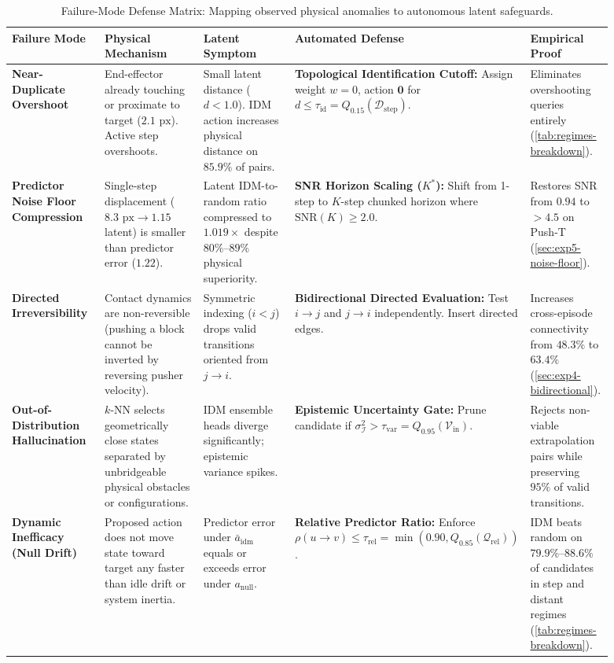 \documentclass[11pt]{article}
\begin{document}
\begin{table}[H]
\centering
\footnotesize
\caption{Failure-Mode Defense Matrix: Mapping observed physical anomalies to autonomous latent safeguards.}
\label{tab:failure-mode-defense}
\begin{tabular}{@{}>{\raggedright\arraybackslash}p{0.16\linewidth}>{\raggedright\arraybackslash}p{0.18\linewidth}>{\raggedright\arraybackslash}p{0.17\linewidth}>{\raggedright\arraybackslash}p{0.24\linewidth}>{\raggedright\arraybackslash}p{0.14\linewidth}@{}}
\toprule
\textbf{Failure Mode} & \textbf{Physical Mechanism} & \textbf{Latent Symptom} & \textbf{Automated Defense} & \textbf{Empirical Proof} \\
\midrule
\textbf{Near-Duplicate Overshoot} &
End-effector already touching or proximate to target ($2.1\text{ px}$). Active step overshoots. &
Small latent distance ($d < 1.0$). IDM action increases physical distance on $85.9\%$ of pairs. &
\textbf{Topological Identification Cutoff:} Assign weight $w=0$, action $\mathbf{0}$ for $d \le \tau_{\mathrm{id}} = Q_{0.15}(\mathcal{D}_{\text{step}})$. &
Eliminates overshooting queries entirely (\cref{tab:regimes-breakdown}). \\
\addlinespace
\textbf{Predictor Noise Floor Compression} &
Single-step displacement ($8.3\text{ px} \to 1.15$ latent) is smaller than predictor error ($1.22$). &
Latent IDM-to-random ratio compressed to $1.019\times$ despite $80\%$--$89\%$ physical superiority. &
\textbf{SNR Horizon Scaling ($K^*$):} Shift from 1-step to $K$-step chunked horizon where $\mathrm{SNR}(K) \ge 2.0$. &
Restores SNR from $0.94$ to $> 4.5$ on Push-T (\cref{sec:exp5-noise-floor}). \\
\addlinespace
\textbf{Directed Irreversibility} &
Contact dynamics are non-reversible (pushing a block cannot be inverted by reversing pusher velocity). &
Symmetric indexing ($i < j$) drops valid transitions oriented from $j \to i$. &
\textbf{Bidirectional Directed Evaluation:} Test $i \to j$ and $j \to i$ independently. Insert directed edges. &
Increases cross-episode connectivity from $48.3\%$ to $\mathbf{63.4\%}$ (\cref{sec:exp4-bidirectional}). \\
\addlinespace
\textbf{Out-of-Distribution Hallucination} &
$k$-NN selects geometrically close states separated by unbridgeable physical obstacles or configurations. &
IDM ensemble heads diverge significantly; epistemic variance spikes. &
\textbf{Epistemic Uncertainty Gate:} Prune candidate if $\sigma^2_{\mathcal{I}} > \tau_{\mathrm{var}} = Q_{0.95}(\mathcal{V}_{\text{in}})$. &
Rejects non-viable extrapolation pairs while preserving $95\%$ of valid transitions. \\
\addlinespace
\textbf{Dynamic Inefficacy (Null Drift)} &
Proposed action does not move state toward target any faster than idle drift or system inertia. &
Predictor error under $\bar{a}_{\mathrm{idm}}$ equals or exceeds error under $a_{\mathrm{null}}$. &
\textbf{Relative Predictor Ratio:} Enforce $\rho(u \to v) \le \tau_{\mathrm{rel}} = \min(0.90, Q_{0.85}(\mathcal{Q}_{\text{rel}}))$. &
IDM beats random on $79.9\%$--$88.6\%$ of candidates in step and distant regimes (\cref{tab:regimes-breakdown}). \\
\bottomrule
\end{tabular}
\end{table}
\end{document}
